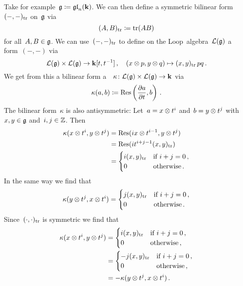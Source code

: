 \begin{example}
  Take for example~$\mathfrak{g} \coloneqq \mathfrak{gl}_n(\mathbf{k})$.
  We can then define a symmetric bilinear form~$(-,-)_{\operatorname{tr}}$ on~$\mathfrak{g}$ via
  \[
    (A,B)_{\operatorname{tr}}
    \coloneqq
    \operatorname{tr}(AB)
  \]
  for all~$A, B \in \mathfrak{g}$.
  We can use~$(-,-)_{\operatorname{tr}}$ to define on the Loop~algebra~$\mathcal{L}(\mathfrak{g})$ a~{} form~$(-,-)$ via
  \[
    \mathcal{L}(\mathfrak{g}) \times \mathcal{L}(\mathfrak{g})
    \to
    \mathbf{k}[t,t^{-1}] \,,
    \quad
    (x \otimes p, y \otimes q)
    \mapsto
    (x,y)_{\operatorname{tr}} \, pq \,.
  \]
  We get from this a bilinear form a~{\twococycle}~$\kappa \colon \mathcal{L}(\mathfrak{g}) \times \mathcal{L}(\mathfrak{g}) \to \mathbf{k}$ via
  \[
    \kappa(a,b)
    \coloneqq
    \operatorname{Res}\left( \frac{\partial a}{\partial t}, b \right) \,.
  \]
  The bilinear form~$\kappa$ is also antisymmetric:
  Let~$a = x \otimes t^i$ and~$b = y \otimes t^j$ with~$x,y \in \mathfrak{g}$ and~$i,j \in \mathbb{Z}$.
  Then
  \begin{align*}
    \kappa(x \otimes t^i, y \otimes t^j)
    &=
    \operatorname{Res}(i x \otimes t^{i-1}, y \otimes t^j)
    \\
    &= 
    \operatorname{Res}(i t^{i+j-1} (x,y)_{\operatorname{tr}})
    \\
    &=
    \begin{cases}
      i (x,y)_{\operatorname{tr}} & \text{if~$i+j = 0$} \,,\\
                  0 & \text{otherwise}  \,.
    \end{cases}
  \end{align*}
  In the same way we find that
  \[
    \kappa(y \otimes t^j, x \otimes t^i)
    =
    \begin{cases}
      j (x,y)_{\operatorname{tr}} & \text{if~$i+j = 0$} \,, \\
                  0 & \text{otherwise}  \,.
    \end{cases}
  \]
  Since~$(\cdot,\cdot)_{\operatorname{tr}}$ is symmetric we find that
  \begin{align*}
    \kappa(x \otimes t^i, y \otimes t^j)
    &=
    \begin{cases}
    i (x,y)_{\operatorname{tr}} & \text{if~$i+j = 0$} \,, \\
                0 & \text{otherwise}  \,,
    \end{cases} \\
    &=
    \begin{cases}
    -j (x,y)_{\operatorname{tr}} & \text{if~$i+j = 0$}  \,, \\
                  0 & \text{otherwise}  \,,
    \end{cases} \\
    &=
    -\kappa(y \otimes t^j, x \otimes t^i) \,.
  \end{align*}
\end{example}


